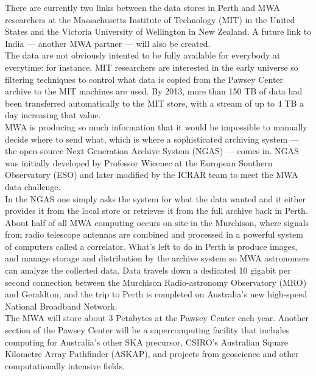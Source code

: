 There are currently two links between the data stores in Perth and MWA researchers at the Massachusetts Institute of Technology (MIT) in the United States and the Victoria University of Wellington in New Zealand. A future link to India — another MWA partner — will also be created.\\

The data are not obviously intented to be fully available for everybody at everytime: for instance, MIT researchers are interested in the early universe so filtering techniques to control what data is copied from the Pawsey Center archive to the MIT machines are used. By 2013, more than 150 TB of data had been transferred automatically to the MIT store, with a stream of up to 4 TB a day increasing that value.\\

MWA is producing so much information that it would be impossible to manually decide where to send what, which is where a sophisticated archiving system — the open-source Next Generation Archive System (NGAS) — comes in. NGAS was initially developed by Professor Wicenec at the European Southern Observatory (ESO) and later modified by the ICRAR team to meet the MWA data challenge.\\

In the NGAS one simply asks the system for what the data wanted and it either provides it from the local store or retrieves it from the full archive back in Perth.\\

About half of all MWA computing occurs on site in the Murchison, where signals from radio telescope antennas are combined and processed in a powerful system of computers called a correlator. What's left to do in Perth is produce images, and manage storage and distribution by the archive system so MWA astronomers can analyze the collected data. Data travels down a dedicated 10 gigabit per second connection between the Murchison Radio-astronomy Observatory (MRO) and Geraldton, and the trip to Perth is completed on Australia’s new high-speed National Broadband Network.\\

The MWA will store about 3 Petabytes at the Pawsey Center each year. Another section of the Pawsey Center will be a supercomputing facility that includes computing for Australia's other SKA precursor, CSIRO’s Australian Square Kilometre Array Pathfinder (ASKAP), and projects from geoscience and other computationally intensive fields.\\

